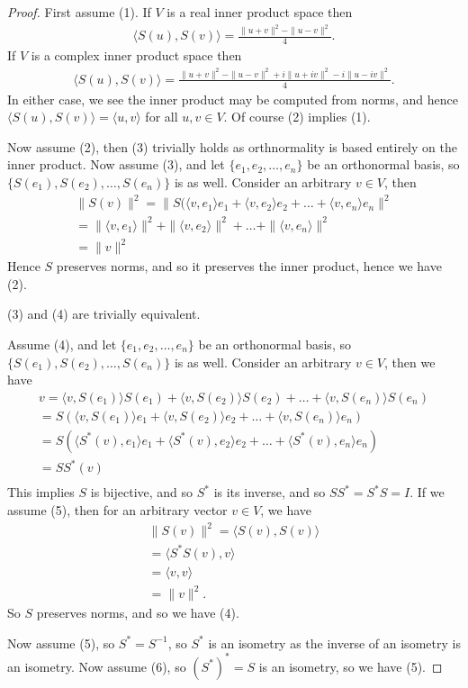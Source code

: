 \documentclass[]{article}
\begin{document}
\begin{proof}
		First assume (1). If $V$ is a real inner product space then
		\begin{align*}
				\langle S(u), S(v) \rangle = \frac{\|u+v\|^2 - \|u-v\|^2}{4}.
		\end{align*}
		If $V$ is a complex inner product space then
		\begin{align*}
				\langle S(u), S(v) \rangle = \frac{\|u+v\|^2 - \|u-v\|^2 + i\|u+iv\|^2 - i\|u-iv\|^2}{4}.
		\end{align*}
		In either case, we see the inner product may be computed from norms, and hence $\langle S(u), S(v) \rangle = \langle u, v \rangle $ for all $u, v \in V$. Of course (2) implies (1).

		Now assume (2), then (3) trivially holds as orthnormality is based entirely on the inner product. Now assume (3), and let $\{e_1, e_2, \ldots, e_n\}$ be an orthonormal basis, so $\{S(e_1), S(e_2), \ldots, S(e_n)\}$ is as well. Consider an arbitrary $v \in V$, then 
\begin{align*}
		\|S(v)\|^2 = \|S(\langle v, e_1 \rangle e_1 + \langle v, e_2 \rangle e_2 + \ldots + \langle v, e_n \rangle e_n\|^2 \\
		= \|\langle v, e_1 \rangle \|^2 + \|\langle v, e_2 \rangle \|^2 + \ldots + \|\langle v, e_n \rangle \|^2 \\
		= \|v\|^2
\end{align*}
Hence $S$ preserves norms, and so it preserves the inner product, hence we have (2).

(3) and (4) are trivially equivalent.

Assume (4), and let $\{e_1, e_2, \ldots, e_n\}$ be an orthonormal basis, so $\{S(e_1), S(e_2), \ldots, S(e_n)\}$ is as well. Consider an arbitrary $v \in V$, then we have
\begin{align*}
		v = \langle v, S(e_1) \rangle S(e_1) + \langle v, S(e_2) \rangle S(e_2) + \ldots + \langle v, S(e_n) \rangle S(e_n) \\
		= S(\langle v, S(e_1) \rangle e_1 + \langle v, S(e_2) \rangle e_2 + \ldots + \langle v, S(e_n) \rangle e_n) \\
		= S(\langle S^*(v), e_1 \rangle e_1 + \langle S^*(v), e_2 \rangle e_2 + \ldots + \langle S^*(v), e_n \rangle e_n) \\
		= SS^*(v) \\
\end{align*}
This implies $S$ is bijective, and so $S^*$ is its inverse, and so $SS^* = S^*S = I$. If we assume (5), then for an arbitrary vector $v \in V$, we have 
\begin{align*}
		\|S(v)\|^2 = \langle S(v), S(v) \rangle \\
		=\langle S^*S(v), v \rangle \\
		=\langle v, v \rangle \\
		= \|v\|^2.
\end{align*}
So $S$ preserves norms, and so we have (4).

Now assume (5), so $S^* = S^{-1}$, so $S^*$ is an isometry as the inverse of an isometry is an isometry. Now assume (6), so $(S^*)^* = S$ is an isometry, so we have (5).
\end{proof}
\end{document}

